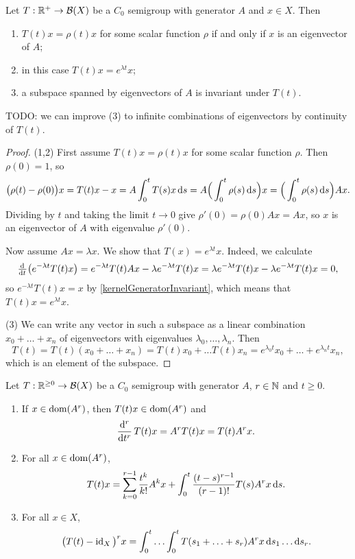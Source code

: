 \begin{corollary} \label{eigenvectorsGenerator}
Let $T: \R^{+}\to \Bounded(X)$ be a $C_0$ semigroup with generator $A$ and $x\in X$.
Then
\begin{enumerate}
\item $T(t)x = \rho(t)x$ for some scalar function $\rho$ \textup{if and only if} $x$ is an eigenvector of $A$;
\item in this case $T(t)x = e^{\lambda t}x$;
\item a subspace spanned by eigenvectors of $A$ is invariant under $T(t)$.
\end{enumerate}
\end{corollary}
TODO: we can improve (3) to infinite combinations of eigenvectors by continuity of $T(t)$.
\begin{proof}
(1,2) First assume $T(t)x = \rho(t)x$ for some scalar function $\rho$. Then $\rho(0) = 1$, so
\[ \big(\rho(t) - \rho(0)\big)x = T(t)x - x = A\int_0^t T(s)x\diff{s} = A\Big(\int_0^t \rho(s)\diff{s}\Big)x = \Big(\int_0^t \rho(s)\diff{s}\Big)Ax. \]
Dividing by $t$ and taking the limit $t\to 0$ give $\rho'(0) = \rho(0)Ax = Ax$, so $x$ is an eigenvector of $A$ with eigenvalue $\rho'(0)$.

Now assume $Ax = \lambda x$. We show that $T(x) = e^{\lambda t}x$. Indeed, we calculate
\[ \od{}{t}\big(e^{-\lambda t}T(t)x\big) = e^{-\lambda t}T(t)Ax - \lambda e^{-\lambda t}T(t)x = \lambda e^{-\lambda t}T(t)x - \lambda e^{-\lambda t}T(t)x = 0, \]
so $e^{-\lambda t}T(t)x = x$ by \ref{kernelGeneratorInvariant}, which means that $T(t)x = e^{\lambda t}x$.

(3) We can write any vector in such a subspace as a linear combination $x_0 + \ldots + x_n$ of eigenvectors with eigenvalues $\lambda_0, \ldots, \lambda_n$. Then
\[ T(t) = T(t)(x_0 + \ldots + x_n) = T(t)x_0 + \ldots T(t)x_n = e^{\lambda_0t}x_0 + \ldots + e^{\lambda_nt}x_n, \]
which is an element of the subspace.
\end{proof}

\begin{corollary}
Let $T: \R^{\geq 0}\to \Bounded(X)$ be a $C_0$ semigroup with generator $A$, $r\in\N$ and $t\geq 0$.
\begin{enumerate}
\item If $x\in \dom(A^r)$, then $T(t)x\in\dom(A^r)$ and
\[ \dod[r]{}{t}T(t)x = A^rT(t)x = T(t)A^r x. \]
\item For all $x\in\dom(A^r)$,
\[ T(t)x = \sum_{k=0}^{r-1}\frac{t^k}{k!}A^kx + \int_0^t \frac{(t-s)^{r-1}}{(r-1)!}T(s)A^rx \diff{s}. \]
\item For all $x\in X$,
\[ \big(T(t) - \id_X\big)^rx = \int_0^t\ldots \int_0^t T(s_1 +\ldots +s_r)A^rx \diff{s_1}\ldots \diff{s_r}. \]
\end{enumerate}
\end{corollary}

